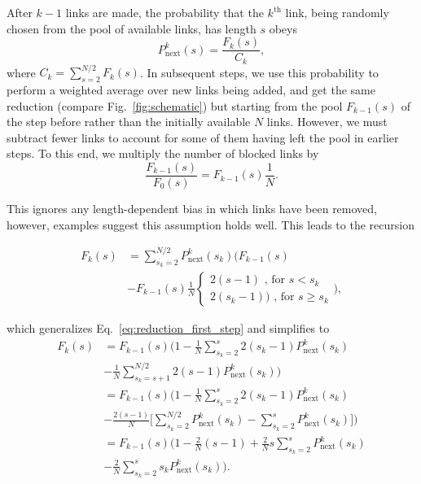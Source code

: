 \documentclass[
reprint,
twocolumn,
amsmath,amssymb,superscriptaddress,aps,
pre]{revtex4-1}
\newcommand{\Pin}{P_{\mathrm{next}}}
\begin{document}
After $k-1$ links are made, the probability that the $k^{\mathrm{th}}$ link, being randomly chosen from the pool of available links, has length $s$ obeys
\begin{equation}
    \Pin^k(s)=\frac{F_k(s)}{C_k},
\end{equation}
where $C_k=\sum_{s=2}^{N/2}F_k(s)$. In subsequent steps, we use this probability to perform a weighted average over new links being added, and get the same reduction (compare Fig.~\ref{fig:schematic}) but starting from the pool $F_{k-1}(s)$ of the step before rather than the initially available $N$ links. However, we must subtract fewer links to account for some of them having left the pool in earlier steps. To this end, we multiply the number of blocked links by
\begin{equation}
    \frac{F_{k-1}(s)}{F_0(s)} = F_{k-1}(s)\frac{1}{N}.
    \label{eq.Pk}
\end{equation}

This ignores any length-dependent bias in which links have been removed, however, examples suggest this assumption holds well. 
This leads to the recursion

\begin{align}
    F_k(s)&= \sum_{s_k=2}^{N/2} \Pin^k(s_k)\nonumber \bigg(F_{k-1}(s) \\
    & - F_{k-1}(s)\frac{1}{N}
    {\begin{cases}
     2(s-1) \text{ , for } s<s_k\\
     2(s_k -1))\text{ , for } s\geq s_k
    \end{cases}}\bigg),
\end{align}

which generalizes Eq.~\ref{eq:reduction_first_step} and simplifies to
\begin{align}
   F_k(s)&=F_{k-1}(s)\Big(1-\frac{1}{N} \sum_{s_k=2}^{s} 2 (s_k-1) \Pin^k(s_k)\nonumber \\
   &-\frac{1}{N} \sum_{s_k=s+1}^{N/2} 2 (s-1) \Pin^k(s_k)\Big)\nonumber \\
   &=F_{k-1}(s)\bigg(1-\frac{1}{N}
   \sum_{s_k=2}^{s} 2 (s_k-1) \Pin^k(s_k)\nonumber \\
   &-\frac{2 (s-1)}{N} \Big[\sum_{s_k=2}^{N/2} \Pin^k(s_k) - \sum_{s_k=2}^{s} \Pin^k(s_k)\Big]\bigg)\nonumber \\
   &=F_{k-1}(s)\Big(1-\frac{2}{N} (s-1) 
   +\frac{2}{N} s
   \sum_{s_k=2}^{s}\Pin^k(s_k)\nonumber \\
   &-\frac{2}{N}
   \sum_{s_k=2}^{s} s_k \Pin^k(s_k)\Big).
   \label{eq.Fk_rec}
\end{align}
\end{document}
